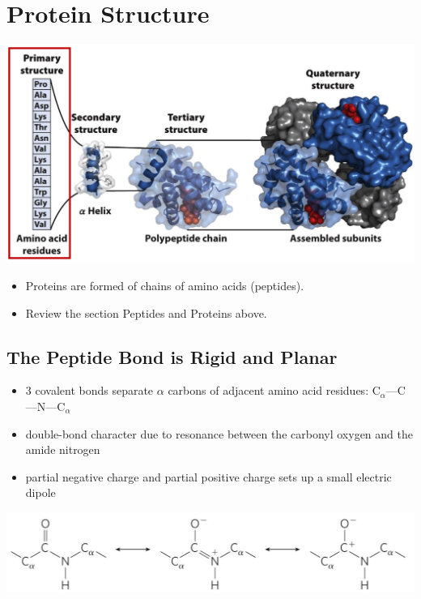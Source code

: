 \documentclass[10pt]{article}
\begin{document}
\section*{Protein Structure}
\begin{center}
    \includegraphics[width=\textwidth]{L4_6.png}
\end{center}
\begin{itemize}
    \item Proteins are formed of chains of amino acids (peptides).  
    \item Review the section Peptides and Proteins above.
\end{itemize}
\subsection*{The Peptide Bond is Rigid and Planar}
\begin{itemize}
    \item 3 covalent bonds separate $\alpha$ carbons of adjacent amino acid residues: C$_\alpha$---C---N---C$_\alpha$
    \item double-bond character due to resonance between the carbonyl oxygen and the amide nitrogen
    \item partial negative charge and partial positive charge sets up a small electric dipole
\end{itemize}
\begin{center}
    \includegraphics*[width=\textwidth]{L4_7.png}
\end{center}
\end{document}
